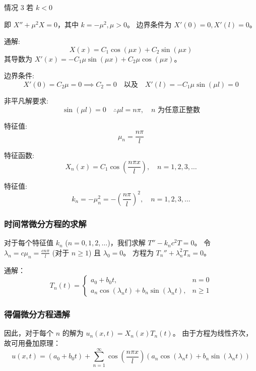 \documentclass[12pt,a4paper]{article}
\numberwithin{subsection}{section}
\numberwithin{subsubsection}{subsection}
\theoremstyle{plain}
\theoremstyle{definition}
\theoremstyle{remark}
\begin{document}
	情况 3 \quad 若 \(k < 0\)
	
	即 \(X'' + \mu^2 X = 0\)，其中 \(k = -\mu^2, \mu > 0\)。
	边界条件为 $X'(0) = 0, X'(l) = 0$。
	
	通解:
	\begin{equation}
		X(x) = C_1 \cos(\mu x) + C_2 \sin(\mu x)
	\end{equation}
	其导数为 $X'(x) = -C_1 \mu \sin(\mu x) + C_2 \mu \cos(\mu x)$。
	
	边界条件:
	\begin{equation}
		X'(0) = C_2 \mu = 0 \implies C_2 = 0 \quad \text{以及} \quad X'(l) = -C_1 \mu \sin(\mu l) = 0
	\end{equation}
	
	非平凡解要求:
	\begin{equation*}
		\sin(\mu l) = 0 \quad \therefore \mu l = n\pi, \quad n \text{ 为任意正整数}
	\end{equation*}
	
	特征值:
	\begin{equation}
		\mu_n = \frac{n\pi}{l}
	\end{equation}
	
	特征函数:
	\begin{equation}
		X_n(x) = C_1 \cos\left(\frac{n\pi x}{l}\right), \quad n = 1, 2, 3, \ldots
	\end{equation}
	
	特征值:
	\begin{equation}
		k_n = -\mu_n^2 = -\left(\frac{n\pi}{l}\right)^2, \quad n = 1, 2, 3, \ldots
	\end{equation}
	
	\subsubsection{时间常微分方程的求解}
	对于每个特征值 $k_n$ ($n=0, 1, 2, \ldots$)，我们求解 $T'' - k_n c^2 T = 0$。
	令 $\lambda_n = c \mu_n = \frac{cn\pi}{l}$ (对于 $n \ge 1$) 且 $\lambda_0 = 0$。
	方程为 $T_n'' + \lambda_n^2 T_n = 0$。
	
	通解：
	\begin{equation}
		T_n(t) = 
		\begin{cases}
			a_0 + b_0 t, & n=0 \\
			a_n \cos(\lambda_n t) + b_n \sin(\lambda_n t), & n \ge 1
		\end{cases}
	\end{equation}
	
	\subsubsection{得偏微分方程通解}
	因此，对于每个 $n$ 的解为 $u_n(x,t) = X_n(x) T_n(t)$。
	由于方程为线性齐次，故可用叠加原理：
	\begin{equation}
		u(x, t) = (a_0 + b_0 t) + \sum_{n=1}^{\infty} \cos\left(\frac{n\pi x}{l}\right) \left( a_n \cos(\lambda_n t) + b_n \sin(\lambda_n t) \right)
	\end{equation}
	
\end{document}
